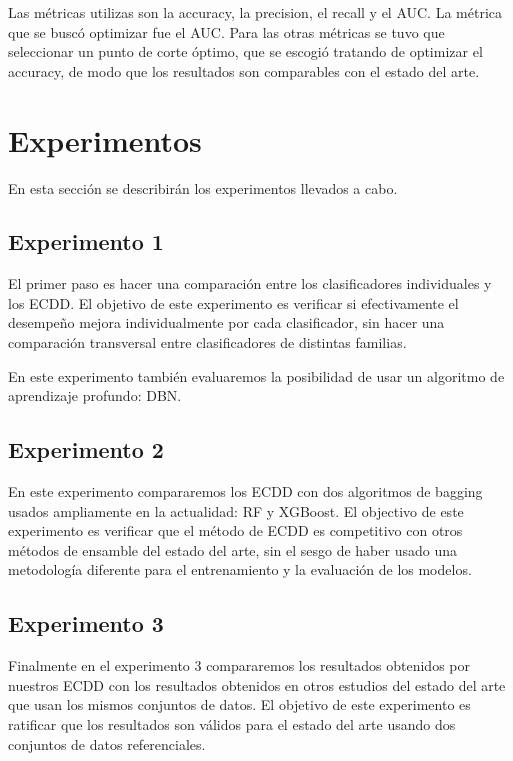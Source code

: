 Las métricas utilizas son la accuracy, la precision, el recall y el AUC. La métrica que se buscó optimizar fue el AUC. Para las otras métricas se tuvo que seleccionar un punto de corte óptimo, que se escogió tratando de optimizar el accuracy, de modo que los resultados son comparables con el estado del arte.

\section{Experimentos}

En esta sección se describirán los experimentos llevados a cabo.

\subsection{Experimento 1}

El primer paso es hacer una comparación entre los clasificadores individuales y los \ac{ECDD}. El objetivo de este experimento es verificar si efectivamente el desempeño mejora individualmente por cada clasificador, sin hacer una comparación transversal entre clasificadores de distintas familias.

En este experimento también evaluaremos la posibilidad de usar un algoritmo de aprendizaje profundo: \ac{DBN}.

\subsection{Experimento 2}

En este experimento compararemos los \ac{ECDD} con dos algoritmos de bagging usados ampliamente en la actualidad: \ac{RF} y \ac{XGBoost}. El objectivo de este experimento es verificar que el método de \ac{ECDD} es competitivo con otros métodos de ensamble del estado del arte, sin el sesgo de haber usado una metodología diferente para el entrenamiento y la evaluación de los modelos.

\subsection{Experimento 3}

Finalmente en el experimento 3 compararemos los resultados obtenidos por nuestros \ac{ECDD} con los resultados obtenidos en otros estudios del estado del arte que usan los mismos conjuntos de datos. El objetivo de este experimento es ratificar que los resultados son válidos para el estado del arte usando dos conjuntos de datos referenciales.
